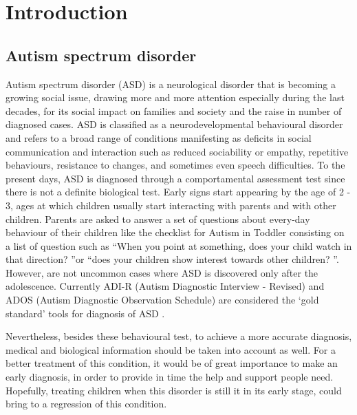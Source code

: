 \documentclass[11pt]{report}
\begin{document}


\chapter{Introduction}\label{chap:introduction}
\section{Autism spectrum disorder} \label{chap:autism}
Autism spectrum disorder (ASD) is a neurological disorder that is becoming a growing social issue, drawing more and more attention especially during the last decades, for its social impact on families and society and the raise in number of diagnosed cases.
ASD is classified as a neurodevelopmental behavioural disorder \cite{guze-1995} \cite{who-1993} and refers to a broad range of conditions manifesting as deficits in social communication and interaction such as reduced sociability or empathy, repetitive behaviours, resistance to changes, and sometimes even speech difficulties.\cite{rapin-2008}
To the present days, ASD is diagnosed through a comportamental assessment test since there is not a definite biological test.
Early signs start appearing by the age of 2 - 3, ages at which children usually start interacting with parents and with other children.
Parents are asked to answer a set of questions about every-day behaviour of their children like the checklist for Autism in Toddler \cite{robins-2009} consisting on a list of question such as \textquotedblleft When you point at something, does your child watch in that direction? \textquotedblright or \textquotedblleft does your children show interest towards other children? \textquotedblright.
However, are not uncommon cases where ASD is discovered only after the adolescence.
Currently ADI-R (Autism Diagnostic Interview - Revised) and ADOS (Autism Diagnostic Observation Schedule) are considered the ‘gold standard’ tools for diagnosis of ASD \cite{ozonoff-2015} \cite{lecouteur-2008}.

Nevertheless, besides these behavioural test, to achieve a more accurate diagnosis, medical and biological information should be taken into account as well.
For a better treatment of this condition, it would be of great importance to make an early diagnosis, in order to provide in time the help and support people need.
Hopefully, treating children when this disorder is still it in its early stage, could bring to a regression of this condition.
\end{document}
